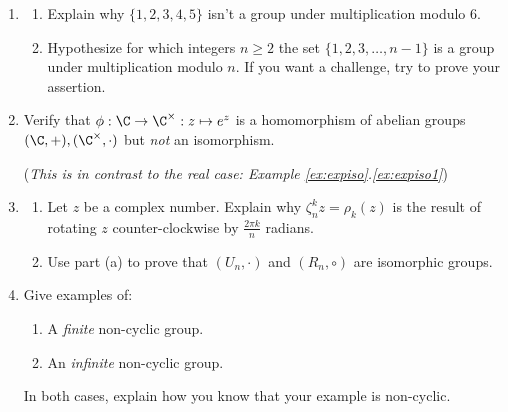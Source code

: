 \begin{exercises}
\begin{enumerate}
	  
	  \item\begin{enumerate}
	  	\item Explain why $\{1,2,3,4,5\}$ isn't a group under multiplication modulo 6.
	   	\item Hypothesize for which integers $n\ge 2$ the set $\{1,2,3,\ldots,n-1\}$ is a group under multiplication modulo $n$. If you want a challenge, try to prove your assertion.
	  \end{enumerate}
		
	
	
	  
	   	\item Verify that $\phi:\C\to\C^\times:z\mapsto e^z$ is a homomorphism of abelian groups $(\C,+),(\C^\times,\cdot)$ but \emph{not} an isomorphism.\par
	   	(\emph{This is in contrast to the real case: Example \ref*{ex:expiso}.\ref{ex:expiso1}})
	
	
	
		\item\begin{enumerate}
		  \item Let $z$ be a complex number. Explain why $\zeta_n^kz=\rho_k(z)$ is the result of rotating $z$ counter-clockwise by $\frac{2\pi k}n$ radians.
		  \item Use part (a) to prove that $(U_n,\cdot)$ and $(R_n,\circ)$ are isomorphic groups.
		\end{enumerate}
		
		
		\item Give examples of:
		\begin{enumerate}
		  \item A \emph{finite} non-cyclic group.
		  \item An \emph{infinite} non-cyclic group.
		\end{enumerate}
		In both cases, explain how you know that your example is non-cyclic.
	 
	\end{enumerate}
\end{exercises}

